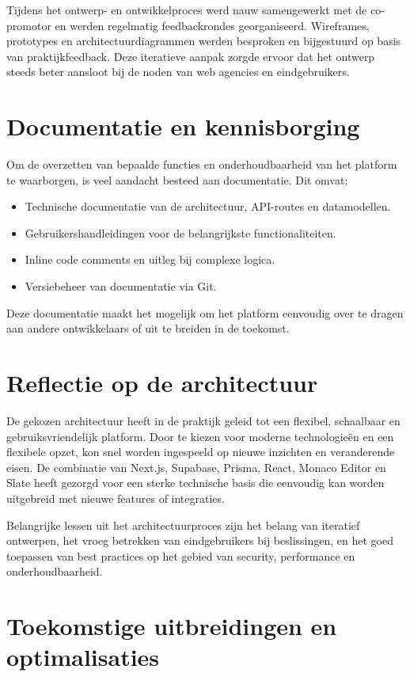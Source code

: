 Tijdens het ontwerp- en ontwikkelproces werd nauw samengewerkt met de co-promotor en werden regelmatig feedbackrondes georganiseerd. Wireframes, prototypes en architectuurdiagrammen werden besproken en bijgestuurd op basis van praktijkfeedback. Deze iteratieve aanpak zorgde ervoor dat het ontwerp steeds beter aansloot bij de noden van web agencies en eindgebruikers.

\section{Documentatie en kennisborging}
\label{sec:documentatie}

Om de overzetten van bepaalde functies en onderhoudbaarheid van het platform te waarborgen, is veel aandacht besteed aan documentatie. Dit omvat:
\begin{itemize}
    \item Technische documentatie van de architectuur, API-routes en datamodellen.
    \item Gebruikershandleidingen voor de belangrijkste functionaliteiten.
    \item Inline code comments en uitleg bij complexe logica.
    \item Versiebeheer van documentatie via Git.
\end{itemize}
Deze documentatie maakt het mogelijk om het platform eenvoudig over te dragen aan andere ontwikkelaars of uit te breiden in de toekomst.

\section{Reflectie op de architectuur}
\label{sec:reflectie-architectuur}

De gekozen architectuur heeft in de praktijk geleid tot een flexibel, schaalbaar en gebruiksvriendelijk platform. Door te kiezen voor moderne technologieën en een flexibele opzet, kon snel worden ingespeeld op nieuwe inzichten en veranderende eisen. De combinatie van Next.js, Supabase, Prisma, React, Monaco Editor en Slate heeft gezorgd voor een sterke technische basis die eenvoudig kan worden uitgebreid met nieuwe features of integraties.

Belangrijke lessen uit het architectuurproces zijn het belang van iteratief ontwerpen, het vroeg betrekken van eindgebruikers bij beslissingen, en het goed toepassen van best practices op het gebied van security, performance en onderhoudbaarheid.

\section{Toekomstige uitbreidingen en optimalisaties}
\label{sec:toekomstige-uitbreidingen}

